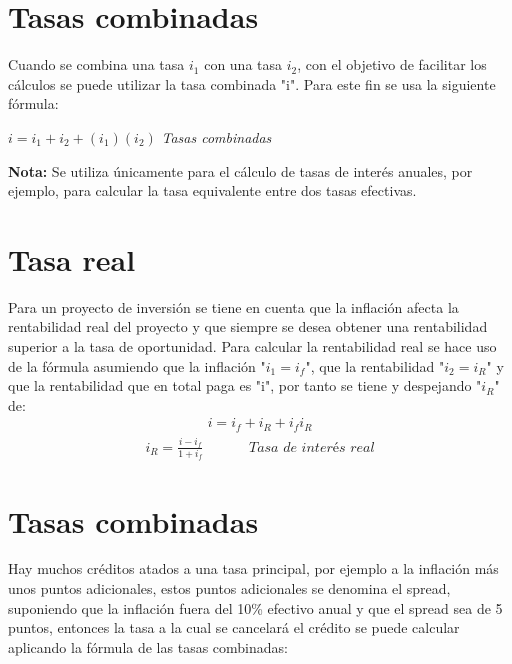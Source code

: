 \section{Tasas combinadas}

Cuando se combina una tasa $i_{1}$ con una tasa $i_{2}$, con el objetivo de facilitar los cálculos se puede utilizar la tasa combinada "i". Para este fin se usa la siguiente fórmula:\\
\centerline{$ i = i_{1} +i_{2} + (i_{1})( i_{2})$ \hspace{15pt}\textit{ Tasas combinadas}\\}
\textbf{Nota:} Se utiliza únicamente para el cálculo de tasas de interés anuales, por ejemplo, para calcular la tasa equivalente entre dos tasas efectivas.\\






\section{Tasa real}
Para un proyecto de inversión se tiene en cuenta que la inflación afecta la rentabilidad real del proyecto y que siempre se desea obtener una rentabilidad superior a la tasa de oportunidad. Para calcular la rentabilidad real se hace uso de la fórmula asumiendo que la inflación "$i_{1} = i_ {f} $", que la rentabilidad "$i_{2} = i_ {R} $" y que la rentabilidad que en total paga es "i", por tanto se tiene y despejando "$i_{R}$" de:
\begin{align*}
 i= i_{f} + i_{R} + i_{f} i_{R}
\end{align*}
\begin{align*}
 i_{R} = \frac{i-i_{f}}{1+i_{f}}\hspace{35pt}\textit{ Tasa de interés real}
\end{align*}







\section{Tasas combinadas}
Hay muchos créditos atados a una tasa principal, por ejemplo a la inflación más unos puntos adicionales, estos puntos adicionales se denomina el spread, suponiendo que la inflación fuera del 10\% efectivo anual y que el spread sea de 5 puntos, entonces la tasa a la cual se cancelará el crédito se puede calcular aplicando la fórmula de las tasas combinadas: \\

